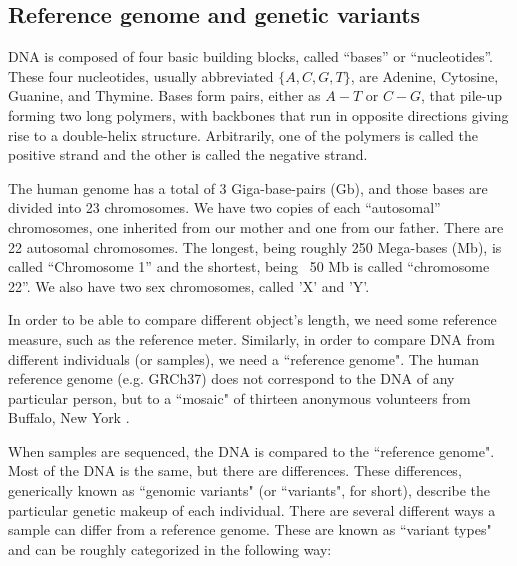 \subsection{Reference genome and genetic variants}

DNA is composed of four basic building blocks, called ``bases'' or ``nucleotides''. These four nucleotides, usually abbreviated $\{A, C, G, T\}$, are Adenine, Cytosine, Guanine, and Thymine. Bases form pairs, either as $A-T$ or $C-G$, that pile-up forming two long polymers, with backbones that run in opposite directions giving rise to a double-helix structure. Arbitrarily, one of the polymers is called the positive strand and the other is called the negative strand.  

The human genome has a total of 3 Giga-base-pairs (Gb), and those bases are divided into 23 chromosomes. We have two copies of each ``autosomal'' chromosomes, one inherited from our mother and one from our father. There are 22 autosomal chromosomes. The longest, being roughly 250 Mega-bases (Mb), is called ``Chromosome 1'' and the shortest, being ~50 Mb is called ``chromosome 22''. We also have two sex chromosomes, called 'X' and 'Y'.

In order to be able to compare different object’s length, we need some reference measure, such as the reference meter. Similarly, in order to compare DNA from different individuals (or samples), we need a ``reference genome". The human reference genome (e.g. GRCh37) does not correspond to the DNA of any particular person, but to a ``mosaic" of thirteen anonymous volunteers from Buffalo, New York \cite{schneider2013genome}.

When samples are sequenced, the DNA is compared to the ``reference genome". Most of the DNA is the same, but there are differences. These differences, generically known as ``genomic variants" (or ``variants", for short), describe the particular genetic makeup of each individual. There are several different ways a sample can differ from a reference genome. These are known as ``variant types" and can be roughly categorized in the following way:

